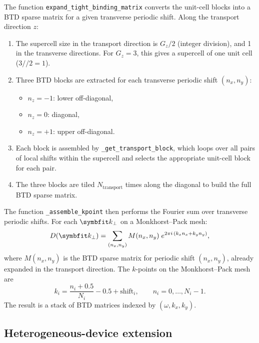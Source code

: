 The function \texttt{expand\_tight\_binding\_matrix} converts the
unit-cell blocks into a BTD sparse matrix for a given transverse
periodic shift.  Along the transport direction $z$:
\begin{enumerate}
  \item The supercell size in the transport direction is $G_z / 2$
        (integer division), and 1 in the transverse directions.  For
        $G_z = 3$, this gives a supercell of one unit cell
        ($3 // 2 = 1$).
  \item Three BTD blocks are extracted for each transverse periodic
        shift $(n_x,n_y)$:
        \begin{itemize}
          \item $n_z=-1$: lower off-diagonal,
          \item $n_z=0$: diagonal,
          \item $n_z=+1$: upper off-diagonal.
        \end{itemize}
  \item Each block is assembled by \texttt{\_get\_transport\_block},
        which loops over all pairs of local shifts within the supercell
        and selects the appropriate unit-cell block for each pair.
  \item The three blocks are tiled $N_\text{transport}$ times along the
        diagonal to build the full BTD sparse matrix.
\end{enumerate}

The function \texttt{\_assemble\_kpoint} then performs the Fourier sum
over transverse periodic shifts.  For each $\vc{k}_\perp$ on a
Monkhorst--Pack mesh:
\begin{equation}\label{eq:assemble}
  D(\vc{k}_\perp)
  = \sum_{(n_x,n_y)} M(n_x,n_y)\;
    e^{2\pi i\,(k_x n_x + k_y n_y)},
\end{equation}
where $M(n_x,n_y)$ is the BTD sparse matrix for periodic shift
$(n_x,n_y)$, already expanded in the transport direction.  The
$k$-points on the Monkhorst--Pack mesh are
\begin{equation}
  k_i = \frac{n_i + 0.5}{N_i} - 0.5 + \text{shift}_i,
  \qquad n_i = 0,\ldots,N_i-1.
\end{equation}
The result is a stack of BTD matrices indexed by
$(\omega,k_x,k_y)$.

\subsection{Heterogeneous-device extension}
\label{sec:heterogeneous}


